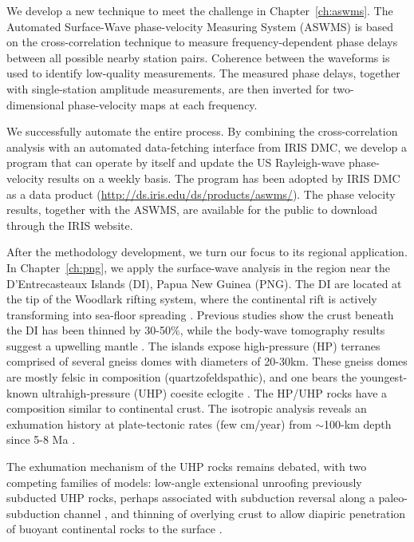 \documentclass[12pt,oneside]{book}
\begin{document}
We develop a new technique to meet the challenge in Chapter~\ref{ch:aswms}. The Automated Surface-Wave phase-velocity Measuring System (ASWMS) is based on the cross-correlation technique to measure frequency-dependent phase delays between all possible nearby station pairs. 
Coherence between the waveforms is used to identify low-quality measurements.  
The measured phase delays, together with single-station amplitude measurements, are then inverted for two-dimensional phase-velocity maps at each frequency.

We successfully automate the entire process. By combining the cross-correlation analysis with an automated data-fetching interface from IRIS DMC, we develop a program that can operate by itself and update the US Rayleigh-wave phase-velocity results on a weekly basis. The program has been adopted by IRIS DMC as a data product (\url{http://ds.iris.edu/ds/products/aswms/}). The phase velocity results,  together with the ASWMS, are available for the public to download through the IRIS website. 

After the methodology development, we turn our focus to its regional application. In Chapter~\ref{ch:png}, we apply the surface-wave analysis in the region near the D'Entrecasteaux Islands (DI), Papua New Guinea (PNG).
The DI are located at the tip of the Woodlark rifting system, where the continental rift is actively transforming into sea-floor spreading \citep[e.g.][]{Taylor:1999ur, Ferris:2006tr}. Previous studies show the crust beneath the DI has been thinned by 30-50\%, while the body-wave tomography results suggest a upwelling mantle \citep{Abers:2002uj, Ferris:2006tr}.
The islands expose high-pressure (HP) terranes comprised of several gneiss domes with diameters of 20-30km. These gneiss domes are mostly felsic in composition (quartzofeldspathic), and one bears the youngest-known ultrahigh-pressure (UHP) coesite eclogite \citep{Baldwin:2004wx, Baldwin:2008gm, Little:2011jy}. The HP/UHP rocks have a composition similar to continental crust. The isotropic analysis reveals an exhumation history at plate-tectonic rates (few cm/year) from $\sim$100-km depth since 5-8 Ma \citep[e.g.][]{Baldwin:2008gm, Gordon:2012hu}.

The exhumation mechanism of the UHP rocks remains debated, with two competing families of models: low-angle extensional unroofing previously subducted UHP rocks, perhaps associated with subduction reversal along a paleo-subduction channel \citep{Hill:1992jd, Webb:2008fc}, and thinning of overlying crust to allow diapiric penetration of buoyant continental rocks to the surface \citep{Ellis:2011jh, Little:2011jy}.
\end{document}
